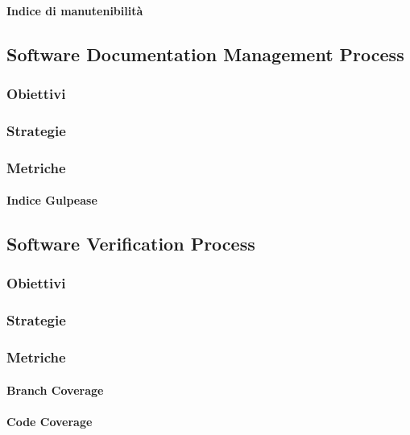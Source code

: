 			\paragraph{Indice di manutenibilità}

	\subsection{Software Documentation Management Process}
		\subsubsection{Obiettivi}
		\subsubsection{Strategie}
		\subsubsection{Metriche}
			\paragraph{Indice Gulpease}

	\subsection{Software Verification Process}
		\subsubsection{Obiettivi}
		\subsubsection{Strategie}
		\subsubsection{Metriche}
			\paragraph{Branch Coverage}
			\paragraph{Code Coverage}

